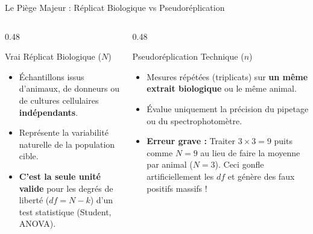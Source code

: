 \documentclass[aspectratio=169,10pt]{beamer}
\begin{document}
\begin{frame}{Le Piège Majeur : Réplicat Biologique vs Pseudoréplication}
  \begin{columns}[onlytextwidth, T]
    \begin{column}{0.48\linewidth}
      \begin{conceptbox}{Vrai Réplicat Biologique ($N$)}
        \begin{itemize}
          \item Échantillons issus d'animaux, de donneurs ou de cultures cellulaires \textbf{indépendants}.
          \item Représente la variabilité naturelle de la population cible.
          \item \textbf{C'est la seule unité valide} pour les degrés de liberté ($df = N - k$) d'un test statistique (Student, ANOVA).
        \end{itemize}
      \end{conceptbox}
    \end{column}
    \begin{column}{0.48\linewidth}
      \begin{warnbox}{Pseudoréplication Technique ($n$)}
        \begin{itemize}
          \item Mesures répétées (triplicats) sur \textbf{un même extrait biologique} ou le même animal.
          \item Évalue uniquement la précision du pipetage ou du spectrophotomètre.
          \item \textbf{Erreur grave :} Traiter $3 \times 3 = 9$ puits comme $N=9$ au lieu de faire la moyenne par animal ($N=3$). Ceci gonfle artificiellement les $df$ et génère des faux positifs massifs !
        \end{itemize}
      \end{warnbox}
    \end{column}
  \end{columns}
\end{frame}
\end{document}
